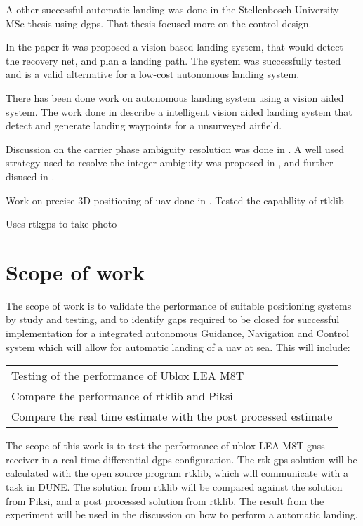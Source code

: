  A other successful automatic landing was done in the Stellenbosch University MSc thesis \citep{smit2013autonomous} using \acrfull{dgps}. That thesis focused more on the control design.

In the paper \citep{kim2013fully} it was proposed a vision based landing system, that would detect the recovery net, and plan a landing path. The system was successfully tested and is a valid alternative for a low-cost autonomous landing system.

There has been done work on autonomous landing system using a vision aided system. The work done in \citep{williams2012intelligent} describe a intelligent vision aided landing system that detect and generate landing waypoints for a unsurveyed airfield.

Discussion on the carrier phase ambiguity resolution was done in \citep{GeodeticBaselines}.  A well used strategy used to resolve the integer ambiguity was proposed in \citep{Ambiguity:Estimation}, and further disused in \citep{LAMBDA:METHOD,LAMBDAMETHOD}. 

Work on precise 3D positioning of \gls{uav} done in \citep{3D-RTK}. Tested the capabllity of rtklib

Uses rtkgps to take photo
\citep{Low-costRTK}  



\section{Scope of work}
The scope of work is to validate the performance of suitable positioning systems by study and testing, and to identify gaps required to be closed for successful implementation for a integrated autonomous Guidance, Navigation and Control system which will allow for automatic landing of a \gls{uav} at sea. This will include:
\begin{table}[!h]
\begin{center}
    \begin{tabular}{ l}
     Testing of the performance of Ublox LEA M8T  \\ 
     Compare the performance of \gls{rtklib} and Piksi \\
     Compare the real time estimate with the post processed estimate 
    \end{tabular}
\end{center}
\label{Tb:Evasion}
\end{table}
The scope of this work is to test the performance of ublox-LEA M8T \gls{gnss} receiver in a real time differential \gls{dgps} configuration. The \gls{rtk-gps} solution will be calculated with the open source program rtklib, which will communicate with a task in DUNE. The solution from rtklib will be compared against the solution from Piksi, and a post processed solution from rtklib. The result from the experiment will be used in the discussion on how to perform a automatic landing.

